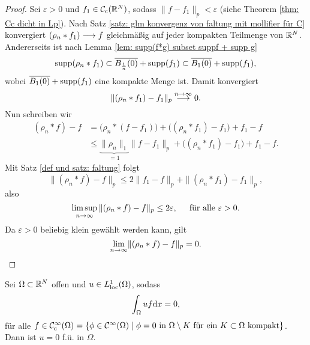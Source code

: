 \begin{proof}
	Sei \(\varepsilon>0\) und \(f_1\in\mathcal{C}_{\mathrm{c}}(\mathbb{R}^N)\), sodass \(\|f-f_1\|_p<\varepsilon\) (siehe Theorem \ref{thm: Cc dicht in Lp}). Nach Satz \ref{satz: glm konvergenz von faltung mit mollifier für C} konvergiert \((\rho_n\ast f_1)\longrightarrow f\) gleichmäßig auf jeder kompakten Teilmenge von \(\mathbb{R}^N\). Andererseits ist nach Lemma \ref{lem: supp(f*g) subset suppf + supp g}
	\begin{equation*}
		\operatorname{supp}(\rho_n\ast f_1)\subset\overline{B_{\frac{1}{n}}(0)}+\operatorname{supp}(f_1)\subset\overline{B_1(0)}+\operatorname{supp}(f_1),
	\end{equation*}
	wobei \(\overline{B_1(0)}+\operatorname{supp}(f_1)\) eine kompakte Menge ist. Damit konvergiert
	\begin{equation*}
		\|(\rho_n\ast f_1)-f_1\|_p\overset{n\rightarrow\infty}{\longrightarrow}0.
	\end{equation*}
	Nun schreiben wir
	\begin{align*}
		(\rho_n\ast f)-f&=\big(\rho_n\ast(f-f_1)\big)+\big((\rho_n\ast f_1)-f_1\big)+f_1-f\\
		&\leq\underbrace{\|\rho_n\|_1}_{=1}\|f-f_1\|_p+\big((\rho_n\ast f_1)-f_1\big)+f_1-f.
	\end{align*}
	Mit Satz \ref{def und satz: faltung} folgt
	\begin{equation*}
		\|(\rho_n\ast f)-f\|_p\leq2\|f_1-f\|_p+\|(\rho_n\ast f_1)-f_1\|_p,
	\end{equation*}
	also
	\begin{equation*}
		\limsup\limits_{n\to\infty}\|(\rho_n\ast f)-f\|_p\leq2\varepsilon,\;\;\;\;\text{ für alle }\varepsilon>0.
	\end{equation*}
	Da \(\varepsilon>0\) beliebig klein gewählt werden kann, gilt
	\begin{equation*}
		\displaystyle{\lim_{n \to \infty}}\|(\rho_n\ast f)-f\|_p=0.
	\end{equation*}
\end{proof}
\begin{cor}\label{kor: int uf = 0 für u in L1loc, also u = 0 fü}
	Sei \(\Omega\subset\mathbb{R}^N\) offen und \(u\in L_{\mathrm{loc}}^1(\Omega)\), sodass
	\begin{equation*}
		\int_\Omega uf\mathrm{d}x=0,
	\end{equation*}
	 für alle \(f\in\mathcal{C}_{\mathrm{c}}^\infty(\Omega)=\{\phi\in\mathcal{C}^\infty(\Omega)\mid\phi=0\text{ in }\Omega\setminus K\text{ für ein }K\subset\Omega\text{ kompakt}\}\). Dann ist \(u=0\) f.ü. in \(\Omega\).
\end{cor}
